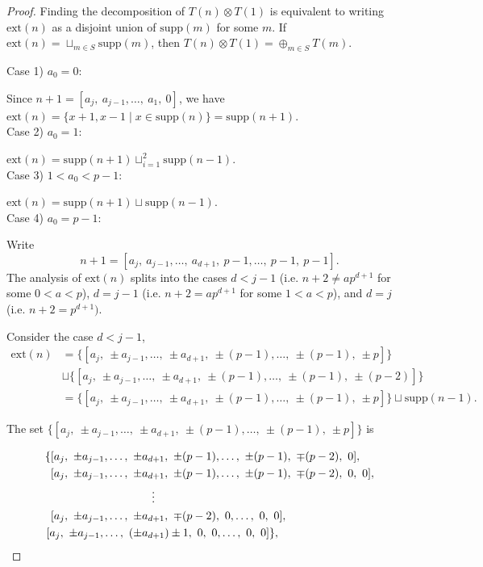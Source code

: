 \documentclass[11 pt]{amsart}
\theoremstyle{plain}
\theoremstyle{definition}
\theoremstyle{remark}
\def\xx{\otimes}
\def\supp{\text{supp}}
\def\ext{\text{ext}}
\begin{document}
\begin{proof}
Finding the decomposition of $T(n) \xx T(1)$ is equivalent to writing $\ext(n)$ as a disjoint union of $\supp (m)$ for some $m$. If $\ext(n)= \sqcup_{m\in S} \supp(m) $, then $T(n)\xx T(1)=\oplus_{m \in S} T(m).$ 
 
    
Case 1) $a_0=0$:

Since $n+1= [a_j,\ a_{j-1}, \ldots,\ a_1,\ 0]$, we have $\ext(n)=\{ x+1, x-1 \mid x \in \supp(n)\}=\supp(n+1).$ \\

Case 2) $a_0=1$:

$\ext(n)= \supp (n+1) \sqcup_{i=1}^2 \supp(n-1).$\\

Case 3) $1<a_0<p-1$:

$\ext(n)=\supp(n+1) \sqcup \supp(n-1)$.\\

Case 4) $a_0=p-1$:

Write \[n+1=[a_j,\ a_{j-1}, \ldots,\ a_{d+1},\  p-1, \ldots, \ p-1, \ p-1].\] The analysis of $\ext(n)$ splits into the cases $d< j-1$ (i.e. $n+2\neq ap^{d+1}$ for some $0<a<p$), $d=j-1$  (i.e. $n+2=ap^{d+1}$ for some $1<a<p$), and $d=j$ (i.e. $n+2=p^{d+1})$.

Consider the case $d< j-1$,
\begin{align*}
    \ext(n)&= \{ [a_j,\ \pm a_{j-1}, \ldots,\ \pm  a_{d+1},\ \pm (p-1), \ldots,\ \pm (p-1), \ \pm p] \} \\
    &\sqcup \{ [a_j,\ \pm a_{j-1}, \ldots,\ \pm  a_{d+1},\ \pm (p-1), \ldots,\ \pm (p-1), \ \pm (p-2)] \}\\
    &=\{ [a_j,\ \pm a_{j-1}, \ldots,\ \pm  a_{d+1},\ \pm (p-1), \ldots, \ \pm (p-1), \ \pm p] \} \sqcup \supp(n-1).
\end{align*}

The set $\{[a_j,\ \pm a_{j-1}, \ldots,\ \pm  a_{d+1},\ \pm (p-1), \ldots, \ \pm (p-1), \ \pm p] \}$ is

\begin{equation} \label{1}
    \begin{aligned}
    \{  [a_j,\ \pm a_{j-1}, \ldots,\ \pm  &a_{d+1},\ \pm (p-1), \ldots,\ \pm (p-1), \ \mp (p-2), \ 0],\\
      [a_j,\ \pm a_{j-1}, \ldots,\ \pm  &a_{d+1},\ \pm (p-1), \ldots,\ \pm (p-1), \ \mp (p-2), \ 0, \ 0], \\
  &\vdotswithin{a_{d+1}}\\
[a_j,\ \pm a_{j-1}, \ldots,\ \pm & a_{d+1},\ \mp (p-2),\ 0, \ldots,  \ 0, \ 0],\\       
    [a_j,\ \pm a_{j-1}, \ldots,\  (\pm & a_{d+1})\pm 1,\ 0,\ 0, \ldots,  \ 0, \ 0]  
    \},
\end{aligned}
\end{equation}



\end{proof}
\end{document}
